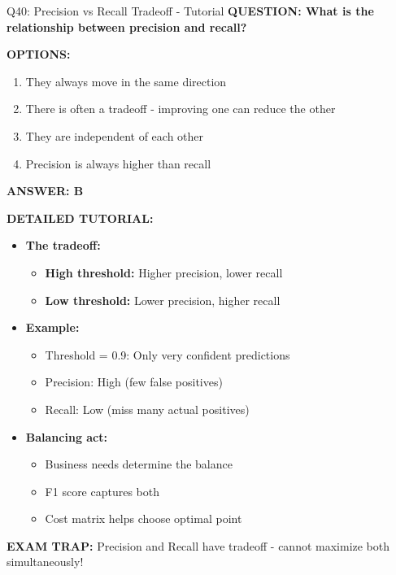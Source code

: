 \documentclass[8pt]{beamer}
\begin{document}
	\begin{frame}{Q40: Precision vs Recall Tradeoff - Tutorial}
		\fontsize{6.5}{7.5}\selectfont
		\textbf{QUESTION: What is the relationship between precision and recall?}
		
		\vspace{0.1cm}
		\textbf{OPTIONS:}
		\begin{enumerate}
			\item They always move in the same direction
			\item There is often a tradeoff - improving one can reduce the other
			\item They are independent of each other
			\item Precision is always higher than recall
		\end{enumerate}
		
		\vspace{0.1cm}
		\textcolor{myblue}{\textbf{ANSWER: B}}
		
		\vspace{0.1cm}
		\textbf{DETAILED TUTORIAL:}
		\begin{itemize}
			\item \textbf{The tradeoff:}
			\begin{itemize}
				\item \textbf{High threshold:} Higher precision, lower recall
				\item \textbf{Low threshold:} Lower precision, higher recall
			\end{itemize}
			\item \textbf{Example:}
			\begin{itemize}
				\item Threshold = 0.9: Only very confident predictions
				\item Precision: High (few false positives)
				\item Recall: Low (miss many actual positives)
			\end{itemize}
			\item \textbf{Balancing act:}
			\begin{itemize}
				\item Business needs determine the balance
				\item F1 score captures both
				\item Cost matrix helps choose optimal point
			\end{itemize}
		\end{itemize}
		
		\textcolor{myred}{\textbf{EXAM TRAP:}} Precision and Recall have \textcolor{myblue}{tradeoff} - cannot maximize both simultaneously!
	\end{frame}
	
\end{document}
